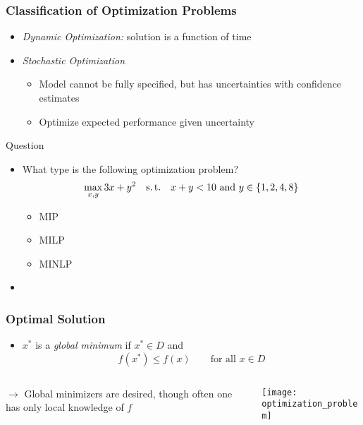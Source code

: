 \documentclass[%
  final,
  11pt, 
  show notes, %
  t, %
  fleqn, %
]{beamer}
\begin{document}
\begin{frame}[fragile]
  \frametitle{Classification of Optimization Problems}
\begin{itemize}
\item \emph{Dynamic Optimization:} solution is a function of time
\item \emph{Stochastic Optimization}
\begin{itemize}
\item Model cannot be fully specified, but has uncertainties with confidence estimates
\item Optimize expected performance given uncertainty
\end{itemize}
\end{itemize}

\begin{exampleblock}{Question}
\begin{itemize}
\item What type is the following optimization problem?
\begin{equation*}
\max\limits_{x,y} 3x + y^2
\quad
\text{s.\,t.}
\quad 
x + y < 10 \text{ and } y \in \left\{ 1, 2, 4, 8 \right\}
\end{equation*}
\begin{itemize}
\item MIP
\item MILP
\item MINLP
\end{itemize}
\item \CourseQuiz
\end{itemize}
\end{exampleblock}
\end{frame}

\begin{frame}[fragile]
  \frametitle{Optimal Solution}
\begin{itemize}
\item $x^\ast$ is a \emph{global minimum} if $x^\ast \in D$ and
\begin{equation*}
f(x^\ast) \leq f(x) \qquad \text{for all } x \in D
\end{equation*}
\end{itemize}

\begin{columns}[T]
\begin{column}{.65\textwidth}
$\rightarrow$ Global minimizers are desired, though often one has only local knowledge of $f$
\end{column}
\begin{column}{.3\textwidth}
\texttt{[image: optimization\_problem]}
\end{column}
\end{columns}
\end{frame}
\end{document}
